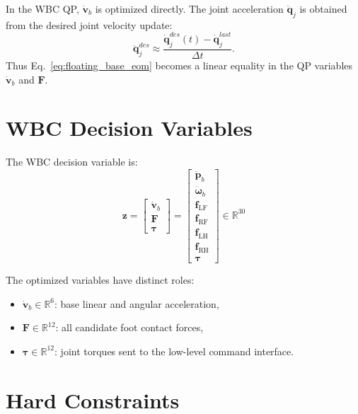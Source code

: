 \documentclass[11pt,a4paper]{article}
\newcommand{\R}{\mathbb{R}}
\begin{document}
In the WBC QP, $\dot{\bm{v}}_b$ is optimized directly. The joint acceleration $\ddot{\bm{q}}_j$ is obtained from the desired joint velocity update:
\begin{equation}
	\ddot{\bm{q}}_j^{des}
	\approx
	\frac{\dot{\bm{q}}_j^{des}(t)-\dot{\bm{q}}_j^{last}}{\Delta t}.
\end{equation}
Thus Eq.~\eqref{eq:floating_base_eom} becomes a linear equality in the QP variables $\dot{\bm{v}}_b$ and $\bm{F}$.


\section{WBC Decision Variables}

The WBC decision variable is:
\begin{equation}
	\boxed{
		\bm{z}
		=
		\begin{bmatrix}
			\dot{\bm{v}}_b\\
			\bm{F}\\
			\bm{\tau}
		\end{bmatrix}
		=
		\begin{bmatrix}
			\ddot{\bm{p}}_b\\
			\dot{\bm{\omega}}_b\\
			\bm{f}_{\text{LF}}\\
			\bm{f}_{\text{RF}}\\
			\bm{f}_{\text{LH}}\\
			\bm{f}_{\text{RH}}\\
			\bm{\tau}
		\end{bmatrix}
		\in \R^{30}
	}
\end{equation}

The optimized variables have distinct roles:
\begin{itemize}
	\item $\dot{\bm{v}}_b\in\R^6$: base linear and angular acceleration,
	\item $\bm{F}\in\R^{12}$: all candidate foot contact forces,
	\item $\bm{\tau}\in\R^{12}$: joint torques sent to the low-level command interface.
\end{itemize}


\section{Hard Constraints}
\label{sec:hard_constraints}
\end{document}
